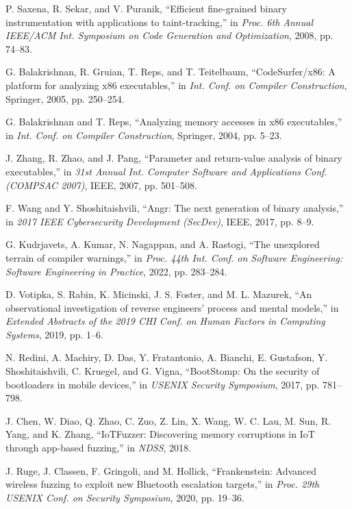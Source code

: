 P. Saxena, R. Sekar, and V. Puranik, ``Efficient fine-grained binary instrumentation with applications to taint-tracking,'' in \textit{Proc. 6th Annual IEEE/ACM Int. Symposium on Code Generation and Optimization}, 2008, pp. 74--83.

G. Balakrishnan, R. Gruian, T. Reps, and T. Teitelbaum, ``CodeSurfer/x86: A platform for analyzing x86 executables,'' in \textit{Int. Conf. on Compiler Construction}, Springer, 2005, pp. 250--254.

G. Balakrishnan and T. Reps, ``Analyzing memory accesses in x86 executables,'' in \textit{Int. Conf. on Compiler Construction}, Springer, 2004, pp. 5--23.

J. Zhang, R. Zhao, and J. Pang, ``Parameter and return-value analysis of binary executables,'' in \textit{31st Annual Int. Computer Software and Applications Conf. (COMPSAC 2007)}, IEEE, 2007, pp. 501--508.

F. Wang and Y. Shoshitaishvili, ``Angr: The next generation of binary analysis,'' in \textit{2017 IEEE Cybersecurity Development (SecDev)}, IEEE, 2017, pp. 8--9.

G. Kudrjavets, A. Kumar, N. Nagappan, and A. Rastogi, ``The unexplored terrain of compiler warnings,'' in \textit{Proc. 44th Int. Conf. on Software Engineering: Software Engineering in Practice}, 2022, pp. 283--284.

D. Votipka, S. Rabin, K. Micinski, J. S. Foster, and M. L. Mazurek, ``An observational investigation of reverse engineers' process and mental models,'' in \textit{Extended Abstracts of the 2019 CHI Conf. on Human Factors in Computing Systems}, 2019, pp. 1--6.

N. Redini, A. Machiry, D. Das, Y. Fratantonio, A. Bianchi, E. Gustafson, Y. Shoshitaishvili, C. Kruegel, and G. Vigna, ``BootStomp: On the security of bootloaders in mobile devices,'' in \textit{USENIX Security Symposium}, 2017, pp. 781--798.

J. Chen, W. Diao, Q. Zhao, C. Zuo, Z. Lin, X. Wang, W. C. Lau, M. Sun, R. Yang, and K. Zhang, ``IoTFuzzer: Discovering memory corruptions in IoT through app-based fuzzing,'' in \textit{NDSS}, 2018.

J. Ruge, J. Classen, F. Gringoli, and M. Hollick, ``Frankenstein: Advanced wireless fuzzing to exploit new Bluetooth escalation targets,'' in \textit{Proc. 29th USENIX Conf. on Security Symposium}, 2020, pp. 19--36.
